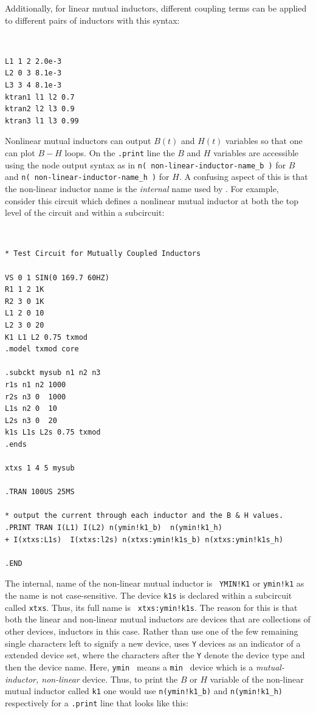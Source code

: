 Additionally, for linear mutual inductors,
different coupling terms can be applied to different pairs of inductors with this syntax:
{\tt 
\begin{verbatim}
L1 1 2 2.0e-3
L2 0 3 8.1e-3
L3 3 4 8.1e-3 
ktran1 l1 l2 0.7
ktran2 l2 l3 0.9
ktran3 l1 l3 0.99
\end{verbatim}
}

Nonlinear mutual inductors can output $B(t)$ and $H(t)$ variables so that
one can plot $B-H$ loops.  On the {\tt .print} line the $B$ and $H$ variables 
are accessible using the node output syntax as in {\tt n( non-linear-inductor-name\_b )} for $B$
and {\tt n( non-linear-inductor-name\_h )} for $H$.  A confusing aspect of this is that 
the non-linear inductor name is the {\em internal } name used by \Xyce{}.  For example, 
consider this circuit which defines a nonlinear mutual inductor at both the top level of
the circuit and within a subcircuit:

{\tt 
\begin{verbatim}
* Test Circuit for Mutually Coupled Inductors

VS 0 1 SIN(0 169.7 60HZ)
R1 1 2 1K
R2 3 0 1K
L1 2 0 10
L2 3 0 20
K1 L1 L2 0.75 txmod
.model txmod core 

.subckt mysub n1 n2 n3 
r1s n1 n2 1000
r2s n3 0  1000
L1s n2 0  10
L2s n3 0  20   
k1s L1s L2s 0.75 txmod
.ends

xtxs 1 4 5 mysub

.TRAN 100US 25MS

* output the current through each inductor and the B & H values.
.PRINT TRAN I(L1) I(L2) n(ymin!k1_b)  n(ymin!k1_h)  
+ I(xtxs:L1s)  I(xtxs:l2s) n(xtxs:ymin!k1s_b) n(xtxs:ymin!k1s_h)

.END
\end{verbatim}
}

The internal, \Xyce{} name of the non-linear mutual inductor is {\tt
YMIN!K1} or {\tt ymin!k1} as the name is not
case-sensitive.  The device {\tt k1s} is declared within a
subcircuit called {\tt xtxs}. Thus, its full name is {\tt
xtxs:ymin!k1s}. The reason for this is that both the linear and
non-linear mutual inductors are devices that are collections of other
devices, inductors in this case.  Rather than use one of the few
remaining single characters left to signify a new device, \Xyce{} uses
{\tt Y} devices as an indicator of a extended device set, where the
characters after the {\tt Y} denote the device type and then the device
name.  Here, {\tt ymin } means a {\tt min } device which is a {\em
mutual-inductor, non-linear} device.  Thus, to print the $B$ or $H$
variable of the non-linear mutual inductor called {\tt k1} one would
use {\tt n(ymin!k1\_b)} and {\tt n(ymin!k1\_h)}
respectively for a {\tt .print} line that looks like this:

